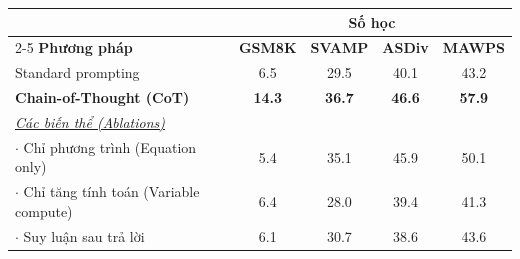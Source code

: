 \begin{tabular}{l c c c c}
    \toprule
    & \multicolumn{4}{c}{\textbf{Số học}} \\
    \cmidrule(lr){2-5}
    \textbf{Phương pháp} & \textbf{GSM8K} & \textbf{SVAMP} & \textbf{ASDiv} & \textbf{MAWPS} \\
    \midrule 
    Standard prompting & 6.5 & 29.5 & 40.1 & 43.2 \\ 
    \textbf{Chain-of-Thought (CoT)} & \textbf{14.3} & \textbf{36.7} & \textbf{46.6} & \textbf{57.9} \\
    \midrule
    \textit{\underline{Các biến thể (Ablations)}} & & & & \\
    $\cdot$ Chỉ phương trình (Equation only) & 5.4 & 35.1 & 45.9 & 50.1 \\
    $\cdot$ Chỉ tăng tính toán (Variable compute) & 6.4 & 28.0 & 39.4 & 41.3 \\ 
    $\cdot$ Suy luận sau trả lời & 6.1 & 30.7 & 38.6 & 43.6 \\
    \bottomrule
\end{tabular}